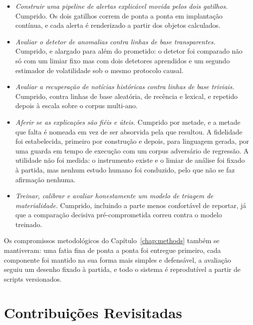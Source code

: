\begin{itemize}
  \item \emph{Construir uma pipeline de alertas explicável movida pelos dois gatilhos.} Cumprido. Os
        dois gatilhos correm de ponta a ponta em implantação contínua, e cada alerta é renderizado a
        partir dos objetos calculados.
  \item \emph{Avaliar o detetor de anomalias contra linhas de base transparentes.} Cumprido, e alargado
        para além do prometido: o detetor foi comparado não só com um limiar fixo mas com dois
        detetores aprendidos e um segundo estimador de volatilidade sob o mesmo protocolo causal.
  \item \emph{Avaliar a recuperação de notícias históricas contra linhas de base triviais.} Cumprido,
        contra linhas de base aleatória, de recência e lexical, e repetido depois à escala sobre o
        corpus multi-ano.
  \item \emph{Aferir se as explicações são fiéis e úteis.} Cumprido por metade, e a metade que falta é
        nomeada em vez de ser absorvida pela que resultou. A fidelidade foi estabelecida, primeiro por
        construção e depois, para linguagem gerada, por uma guarda em tempo de execução com um corpus
        adversário de regressão. A utilidade não foi medida: o instrumento existe e o limiar de análise
        foi fixado à partida, mas nenhum estudo humano foi conduzido, pelo que não se faz afirmação
        nenhuma.
  \item \emph{Treinar, calibrar e avaliar honestamente um modelo de triagem de materialidade.}
        Cumprido, incluindo a parte menos confortável de reportar, já que a comparação decisiva
        pré-comprometida correu contra o modelo treinado.
\end{itemize}

Os compromissos metodológicos do Capítulo~\ref{chap:methods} também se mantiveram: uma fatia fina de
ponta a ponta foi entregue primeiro, cada componente foi mantido na sua forma mais simples e defensável,
a avaliação seguiu um desenho fixado à partida, e todo o sistema é reprodutível a partir de scripts
versionados.

\section{Contribuições Revisitadas}
\label{sec:concl_contributions}

